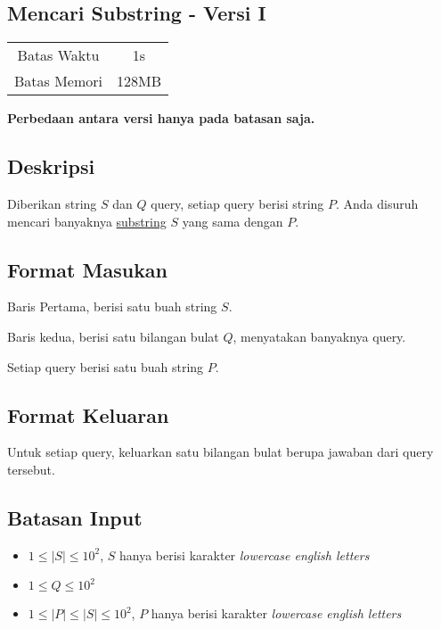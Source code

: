 \documentclass{article}
\begin{document}
\begin{center}
    \section*{Mencari Substring - Versi I} %

    \begin{tabular}{ | c c | }
        \hline
        Batas Waktu  & 1s \\    %
        Batas Memori & 128MB \\  %
        \hline
    \end{tabular}
\end{center}

\begin{center}
    \textbf{Perbedaan antara versi hanya pada batasan saja.}
\end{center}

\subsection*{Deskripsi}

Diberikan string $S$ dan $Q$ query, setiap query berisi string $P$. Anda disuruh mencari banyaknya \href{https://en.wikipedia.org/wiki/Substring}{substring} $S$ yang sama dengan $P$.

\subsection*{Format Masukan}
Baris Pertama, berisi satu buah string $S$.

Baris kedua, berisi satu bilangan bulat $Q$, menyatakan banyaknya query.

Setiap query berisi satu buah string $P$.

\subsection*{Format Keluaran}
Untuk setiap query, keluarkan satu bilangan bulat berupa jawaban dari query tersebut.

\subsection*{Batasan Input}

\begin{itemize}
    \item{$1 \leq |S| \leq 10^2$, $S$ hanya berisi karakter \textit{lowercase english letters}}
    \item{$1 \leq Q \leq 10^2$}
    \item{$1 \leq |P| \leq |S| \leq 10^2$, $P$ hanya berisi karakter \textit{lowercase english letters}}
\end{itemize}
\end{document}
